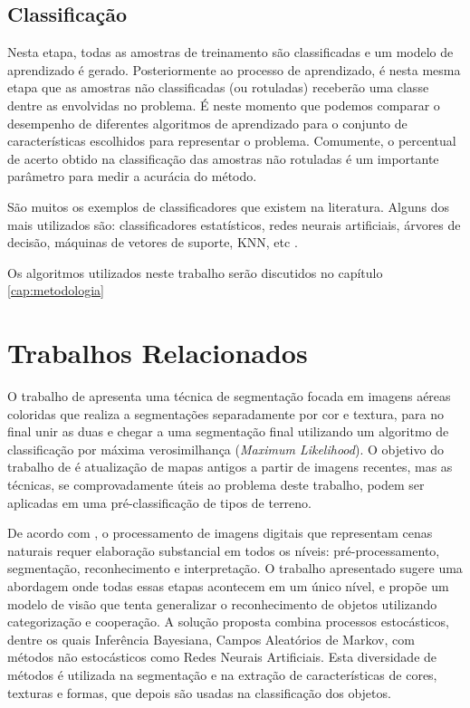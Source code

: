 \subsection{Classificação}

Nesta etapa, todas as amostras de treinamento são classificadas e um modelo de aprendizado é gerado. Posteriormente ao processo de aprendizado, é nesta mesma etapa que as amostras não classificadas (ou rotuladas) receberão uma classe dentre as envolvidas no problema. É neste momento que podemos comparar o desempenho de diferentes algoritmos de aprendizado para o conjunto de características escolhidos para representar o problema. Comumente, o percentual de acerto obtido na classificação das amostras não rotuladas é um importante parâmetro para medir a acurácia do método.

São muitos os exemplos de classificadores que existem na literatura. Alguns dos mais utilizados são: classificadores estatísticos, redes neurais artificiais, árvores de decisão, máquinas de vetores de suporte, KNN, etc \cite{jain:1989}.

Os algoritmos utilizados neste trabalho serão discutidos no capítulo \ref{cap:metodologia}

\section{Trabalhos Relacionados}

O trabalho de \cite{dubuisson:2000} apresenta uma técnica de segmentação focada em imagens aéreas coloridas que realiza a segmentações separadamente por cor e textura, para no final unir as duas e chegar a uma segmentação final utilizando um algoritmo de classificação por máxima verosimilhança (\textit{Maximum Likelihood}). O objetivo do trabalho de \cite{dubuisson:2000} é atualização de mapas antigos a partir de imagens recentes, mas as técnicas, se comprovadamente úteis ao problema deste trabalho, podem ser aplicadas em uma pré-classificação de tipos de terreno.

De acordo com \cite{sadgal:2005}, o processamento de imagens digitais que representam cenas naturais requer elaboração substancial em todos os níveis: pré-processamento, segmentação, reconhecimento e interpretação. O trabalho apresentado sugere uma abordagem onde todas essas etapas acontecem em um único nível, e propõe um modelo de visão que tenta generalizar o reconhecimento de objetos utilizando categorização e cooperação.  A solução proposta combina processos estocásticos, dentre os quais Inferência Bayesiana, Campos Aleatórios de Markov, com métodos não estocásticos como Redes Neurais Artificiais. Esta diversidade de métodos é utilizada na segmentação e na extração de características de cores, texturas e formas, que depois são usadas na classificação dos objetos.

